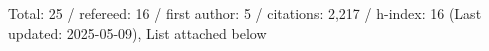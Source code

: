 Total: 25 / refereed: 16 / first author: 5 / citations: 2,217 / h-index: 16 (Last updated: 2025-05-09), List attached below
